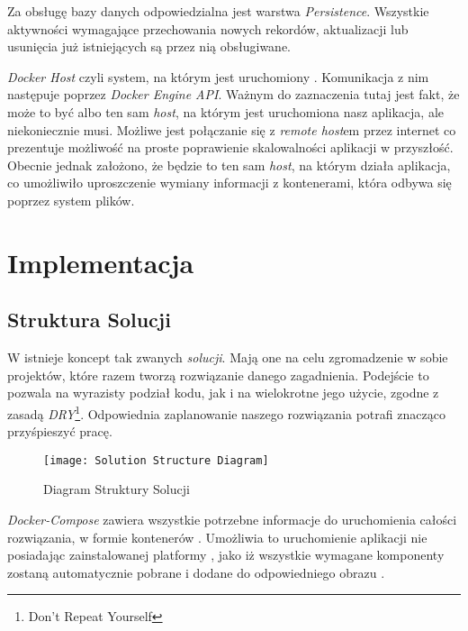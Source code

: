 \par Za obsługę bazy danych odpowiedzialna jest warstwa \emph{Persistence}. Wszystkie aktywności wymagające przechowania nowych rekordów, aktualizacji lub usunięcia już istniejących są przez nią obsługiwane.

\par \emph{Docker Host} czyli system, na którym jest uruchomiony \emph{\docker{}}. Komunikacja z nim następuje poprzez \emph{Docker Engine API}. Ważnym do zaznaczenia tutaj jest fakt, że może to być albo ten sam \emph{host}, na którym jest uruchomiona nasz aplikacja, ale niekoniecznie musi. Możliwe jest połączanie się z \emph{remote host}em przez internet co prezentuje możliwość na proste poprawienie skalowalności aplikacji w przyszłość. Obecnie jednak założono, że będzie to ten sam \emph{host}, na którym działa aplikacja, co umożliwiło uproszczenie wymiany informacji z kontenerami, która odbywa się poprzez system plików.

\section{Implementacja}

\subsection{Struktura Solucji}

\par W \emph{\dotnet{}} istnieje koncept tak zwanych \emph{solucji}. Mają one na celu zgromadzenie w sobie projektów, które razem tworzą rozwiązanie danego zagadnienia. Podejście to pozwala na wyrazisty podział kodu, jak i na wielokrotne jego użycie, zgodne z zasadą \emph{DRY}\footnote{Don't Repeat Yourself}. Odpowiednia zaplanowanie naszego rozwiązania potrafi znacząco przyśpieszyć pracę.

\begin{figure}[H]
	\texttt{[image: Solution Structure Diagram]}
	\caption{Diagram Struktury Solucji}
	\label{fig:solutionStructureDiagram}
\end{figure}

\par \emph{Docker-Compose} zawiera wszystkie potrzebne informacje do uruchomienia całości rozwiązania, w formie kontenerów \emph{\docker{}}. Umożliwia to uruchomienie aplikacji nie posiadając zainstalowanej platformy \emph{\dotnet{}}, jako iż wszystkie wymagane komponenty zostaną automatycznie pobrane i dodane do odpowiedniego obrazu \emph{\docker{}}.

